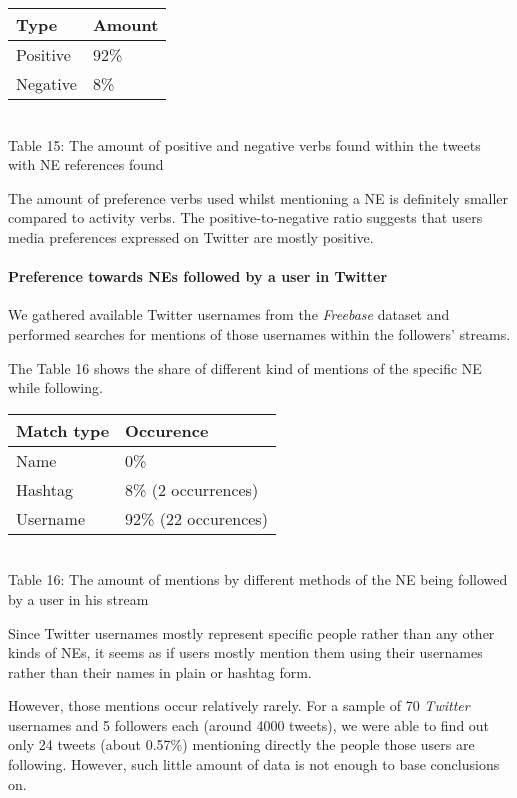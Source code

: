 \begin{center}
  \begin{tabular}{ | p{3cm}| p{2cm} | } \hline
    Type & Amount \\ \hline
    Positive & 92\% \\ \hline
    Negative & 8\% \\ \hline
  \end{tabular} \\
  Table 15: The amount of positive and negative verbs found within the tweets with NE references found \\
\end{center}

The amount of preference verbs used whilst mentioning a NE is definitely
smaller compared to activity verbs. The positive-to-negative ratio suggests that users
media preferences expressed on Twitter are mostly positive.

\paragraph{Preference towards NEs followed by a user in Twitter}
We gathered available Twitter usernames from the \textit{Freebase} dataset and performed searches
for mentions of those usernames within the followers' streams.

The Table 16 shows the share of different kind of mentions of the specific NE while following.

\begin{center}
  \begin{tabular}{ | p{3cm}| p{3.5cm} | } \hline
    Match type & Occurence \\ \hline
    Name & 0\% \\ \hline
    Hashtag & 8\% (2 occurrences) \\ \hline
    Username & 92\% (22 occurences) \\ \hline
  \end{tabular} \\
  Table 16: The amount of mentions by different methods of the NE being followed by a user in his stream \\
\end{center}

Since Twitter usernames mostly represent specific people rather than any other kinds of NEs, it seems as if users mostly
mention them using their usernames rather than their names in plain or hashtag form.

However, those mentions occur relatively rarely. For a sample of 70 \textit{Twitter} usernames and 5 followers each
(around 4000 tweets), we were able to find out only 24 tweets (about 0.57\%) mentioning directly the people those
users are following. However, such little amount of data is not enough to base conclusions on.

